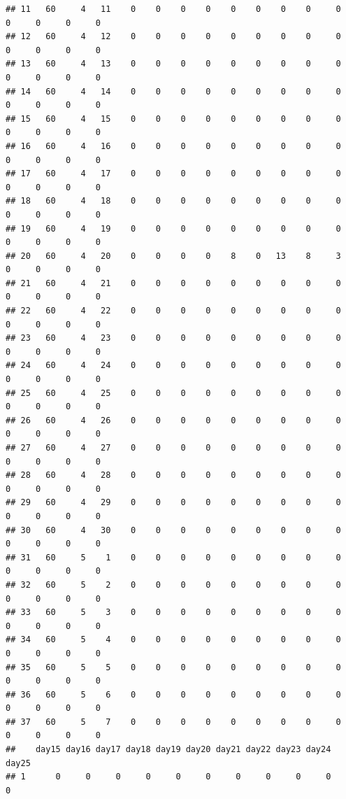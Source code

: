 \documentclass{article}\usepackage[]{graphicx}\usepackage[]{xcolor}
\makeatletter
\newenvironment{kframe}{%
 \def\at@end@of@kframe{}%
 \ifinner\ifhmode%
  \def\at@end@of@kframe{\end{minipage}}%
  \begin{minipage}{\columnwidth}%
 \fi\fi%
 \def\FrameCommand##1{\hskip\@totalleftmargin \hskip-\fboxsep
 \colorbox{shadecolor}{##1}\hskip-\fboxsep
     \hskip-\linewidth \hskip-\@totalleftmargin \hskip\columnwidth}%
 \MakeFramed {\advance\hsize-\width
   \@totalleftmargin\z@ \linewidth\hsize
   \@setminipage}}%
 {\par\unskip\endMakeFramed%
 \at@end@of@kframe}
\newenvironment{knitrout}{}{} %
\makeatother
\begin{document}
\begin{knitrout}
\begin{kframe}
\begin{verbatim}
## 11   60     4   11    0    0    0    0    0    0    0    0     0     0     0     0     0
## 12   60     4   12    0    0    0    0    0    0    0    0     0     0     0     0     0
## 13   60     4   13    0    0    0    0    0    0    0    0     0     0     0     0     0
## 14   60     4   14    0    0    0    0    0    0    0    0     0     0     0     0     0
## 15   60     4   15    0    0    0    0    0    0    0    0     0     0     0     0     0
## 16   60     4   16    0    0    0    0    0    0    0    0     0     0     0     0     0
## 17   60     4   17    0    0    0    0    0    0    0    0     0     0     0     0     0
## 18   60     4   18    0    0    0    0    0    0    0    0     0     0     0     0     0
## 19   60     4   19    0    0    0    0    0    0    0    0     0     0     0     0     0
## 20   60     4   20    0    0    0    0    8    0   13    8     3     0     0     0     0
## 21   60     4   21    0    0    0    0    0    0    0    0     0     0     0     0     0
## 22   60     4   22    0    0    0    0    0    0    0    0     0     0     0     0     0
## 23   60     4   23    0    0    0    0    0    0    0    0     0     0     0     0     0
## 24   60     4   24    0    0    0    0    0    0    0    0     0     0     0     0     0
## 25   60     4   25    0    0    0    0    0    0    0    0     0     0     0     0     0
## 26   60     4   26    0    0    0    0    0    0    0    0     0     0     0     0     0
## 27   60     4   27    0    0    0    0    0    0    0    0     0     0     0     0     0
## 28   60     4   28    0    0    0    0    0    0    0    0     0     0     0     0     0
## 29   60     4   29    0    0    0    0    0    0    0    0     0     0     0     0     0
## 30   60     4   30    0    0    0    0    0    0    0    0     0     0     0     0     0
## 31   60     5    1    0    0    0    0    0    0    0    0     0     0     0     0     0
## 32   60     5    2    0    0    0    0    0    0    0    0     0     0     0     0     0
## 33   60     5    3    0    0    0    0    0    0    0    0     0     0     0     0     0
## 34   60     5    4    0    0    0    0    0    0    0    0     0     0     0     0     0
## 35   60     5    5    0    0    0    0    0    0    0    0     0     0     0     0     0
## 36   60     5    6    0    0    0    0    0    0    0    0     0     0     0     0     0
## 37   60     5    7    0    0    0    0    0    0    0    0     0     0     0     0     0
##    day15 day16 day17 day18 day19 day20 day21 day22 day23 day24 day25
## 1      0     0     0     0     0     0     0     0     0     0     0

\end{verbatim}
\end{kframe}
\end{knitrout}
\end{document}
